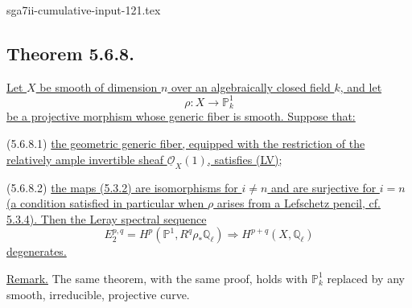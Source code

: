 \begin{filecontents*}{sga7ii-cumulative-input-121.tex}
\subsection*{Theorem 5.6.8.}
\underline{Let $X$ be smooth of dimension $n$ over an algebraically closed
field $k$, and let}
\[
\rho:X\longrightarrow\mathbb P^1_k
\]
\underline{be a projective morphism whose generic fiber is smooth.  Suppose
that:}

\smallskip
\noindent
\textup{(5.6.8.1)}\quad
\underline{the geometric generic fiber, equipped with the restriction of the
relatively ample invertible sheaf $\underline{\mathcal O}_X(1)$, satisfies
(LV);}

\smallskip
\noindent
\textup{(5.6.8.2)}\quad
\underline{the maps (5.3.2) are isomorphisms for $i\neq n$ and are
surjective for $i=n$ (a condition satisfied in particular when $\rho$ arises
from a Lefschetz pencil, cf. 5.3.4).  Then the Leray spectral sequence}
\[
E_2^{p,q}=H^p(\mathbb P^1,R^q\rho_*\mathbb Q_\ell)
\Longrightarrow H^{p+q}(X,\mathbb Q_\ell)
\]
\underline{degenerates.}

\smallskip
\noindent
\underline{Remark.}
The same theorem, with the same proof, holds with $\mathbb P^1_k$ replaced
by any smooth, irreducible, projective curve.


\end{filecontents*}
